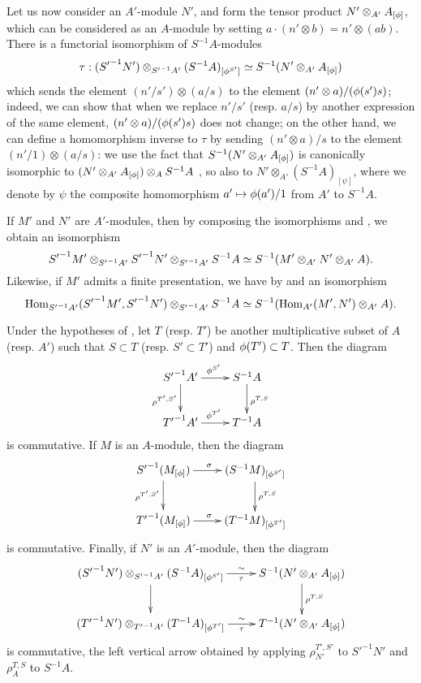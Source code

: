 \begin{env}[1.5.4]
\label{0.1.5.4}
Let us now consider an $A'$-module $N'$, and form the tensor product
$N'\otimes_{A'}A_{[\phi]}$, which can be considered as an $A$-module by setting
$a\cdot(n'\otimes b)=n'\otimes(ab)$.
There is a functorial isomorphism of $S^{-1}A$-modules
\[
  \tau:({S'}^{-1}N')\otimes_{{S'}^{-1}A'}(S^{-1}A)_{[\phi^{S'}]}\simeq S^{-1}(N'\otimes_{A'}A_{[\phi]})
\]
which
sends the element $(n'/s')\otimes(a/s)$ to the element
$(n'\otimes a)/(\phi(s')s)$; indeed, we can show that when we replace
$n'/s'$ (resp. $a/s$) by another expression of the same element,
$(n'\otimes a)/(\phi(s')s)$ does not change; on the other hand, we can define
a homomorphism inverse to $\tau$ by sending $(n'\otimes a)/s$ to the element
$(n'/1)\otimes(a/s)$: we use the fact that $S^{-1}(N'\otimes_{A'}A_{[\phi]})$
is canonically isomorphic to $(N'\otimes_{A'}A_{[\phi]})\otimes_A S^{-1}A$
, so also to $N'\otimes_{A'}(S^{-1}A)_{[\psi]}$, where we
denote by $\psi$ the composite homomorphism $a'\mapsto\vphi(a')/1$ from $A'$ to $S^{-1}A$.
\end{env}

\begin{env}[1.5.5]
\label{0.1.5.5}
If $M'$ and $N'$ are $A'$-modules, then by composing the isomorphisms  and , we obtain an isomorphism
\[
  {S'}^{-1}M'\otimes_{{S'}^{-1}A'}{S'}^{-1}N'\otimes_{{S'}^{-1}A'}S^{-1}A\simeq S^{-1}(M'\otimes_{A'}N'\otimes_{A'}A).
\]
Likewise, if $M'$ admits a finite presentation, we have by  and  an isomorphism
\[
  {\mathop{\mathrm{Hom}}\nolimits}_{{S'}^{-1}A'}({S'}^{-1}M',{S'}^{-1}N')\otimes_{{S'}^{-1}A'}S^{-1}A\simeq S^{-1}({\mathop{\mathrm{Hom}}\nolimits}_{A'}(M',N')\otimes_{A'}A).
\]
\end{env}

\begin{env}[1.5.6]
\label{0.1.5.6}
Under the hypotheses of , let $T$ (resp. $T'$) be another multiplicative subset of $A$ (resp. $A'$) such that $S\subset T$ (resp. $S'\subset T'$) and $\phi(T')\subset T$.
Then the diagram
\[
  \xymatrix{
    {{S'}^{-1}A'}\ar[r]^{\vphi^{S'}}\ar[d]_{\rho^{T',S'}} &
    {S^{-1}A}\ar[d]^{\rho^{T,S}}\\
    {{T'}^{-1}A'}\ar[r]^{\vphi^{T'}} &
    {T^{-1}A}
  }
\]
is commutative.
If $M$ is an $A$-module, then the diagram
\[
  \xymatrix{
    {{S'}^{-1}(M_{[\vphi]})}\ar[r]^\sigma\ar[d]_{\rho^{T',S'}} &
    {(S^{-1}M)_{[\vphi^{S'}]}}\ar[d]^{\rho^{T,S}}\\
    {{T'}^{-1}(M_{[\vphi]})}\ar[r]^\sigma &
    {(T^{-1}M)_{[\vphi^{T'}]}}
  }
\]
is commutative.
Finally, if $N'$ is an $A'$-module, then the diagram
\[
  \xymatrix{
    ({S'}^{-1}N')\otimes_{{S'}^{-1}A'}(S^{-1}A)_{[\vphi^{S'}]}\ar[r]^-\sim_-\tau\ar[d] &
    S^{-1}(N'\otimes_{A'}A_{[\vphi]})\ar[d]^{\rho^{T,S}}\\
    ({T'}^{-1}N')\otimes_{{T'}^{-1}A'}(T^{-1}A)_{[\vphi^{T'}]}\ar[r]^-\sim_-\tau &
    T^{-1}(N'\otimes_{A'}A_{[\vphi]})
  }
\]
is commutative, the left vertical arrow obtained by applying $\rho_{N'}^{T',S'}$ to ${S'}^{-1}N'$ and $\rho_A^{T,S}$ to $S^{-1}A$.
\end{env}

